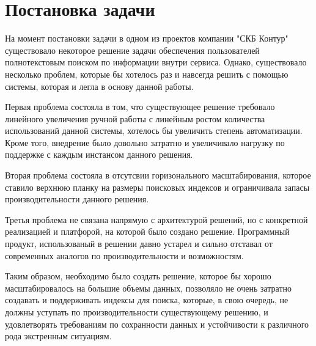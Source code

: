 \section{Постановка задачи}

На момент постановки задачи в одном из проектов компании "СКБ Контур" существовало некоторое решение задачи обеспечения пользователей полнотекстовым поиском по информации внутри сервиса. Однако, существовало несколько проблем, которые бы хотелось раз и навсегда решить с помощью системы, которая и легла в основу данной работы.

Первая проблема состояла в том, что существующее решение требовало линейного увеличения ручной работы с линейным ростом количества использований данной системы, хотелось бы увеличить степень автоматизации. Кроме того, внедрение было довольно затратно и увеличивало нагрузку по поддержке с каждым инстансом данного решения.

Вторая проблема состояла в отсутсвии горизонального масштабирования, которое ставило верхнюю планку на размеры поисковых индексов и ограничивала запасы производительности данного решения.

Третья проблема не связана напрямую с архитектурой решений, но с конкретной реализацией и платфорой, на которой было создано решение. Программный продукт, использованый в решении давно устарел и сильно отставал от современных аналогов по производительности и возможностям.

Таким образом, необходимо было создать решение, которое бы хорошо масштабировалось на большие объемы данных, позволяло не очень затратно создавать и поддерживать индексы для поиска, которые, в свою очередь, не должны уступать по производительности существующему решению, и удовлетворять требованиям по сохранности данных и устойчивости к различного рода экстренным ситуациям.

\clearpage

